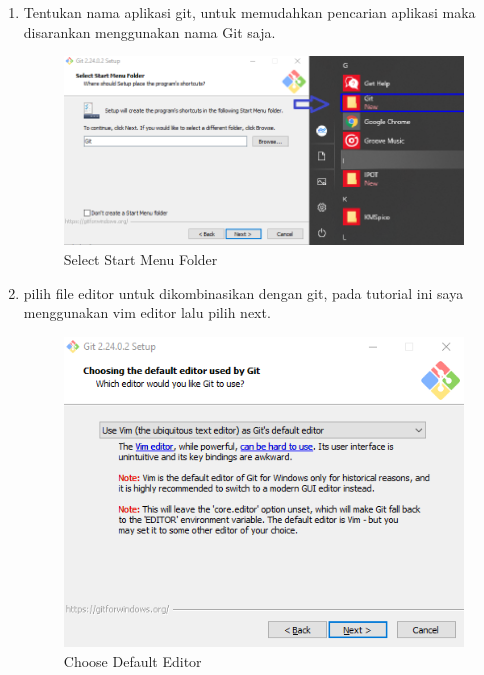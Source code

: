 \begin{enumerate}
\item Tentukan nama aplikasi git, untuk memudahkan pencarian aplikasi maka disarankan menggunakan nama Git saja.
\begin{figure}[H]
\centering
\includegraphics[scale=.35]{figures/install_git4}
\caption{Select Start Menu Folder}
\label{install_git4}
\end{figure}

\item pilih file editor untuk dikombinasikan dengan git, pada tutorial ini saya menggunakan vim editor lalu pilih next.
\begin{figure}[H]
\centering
\includegraphics[scale=.5]{figures/install_git5}
\caption{Choose Default Editor}
\label{install_git5}
\end{figure}


\end{enumerate}

